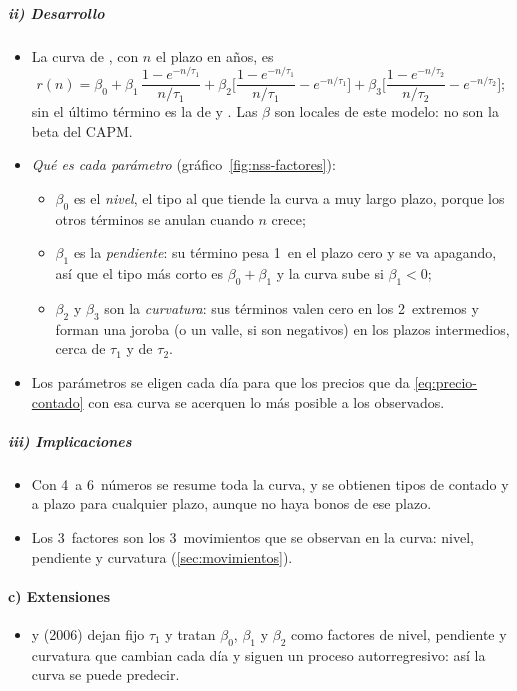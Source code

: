 \documentclass[11pt]{article}
\begin{document}
\subparagraph{ii) Desarrollo}
\begin{itemize}
\item La curva de , con $n$ el plazo en años, es
  \begin{equation}\label{eq:svensson}
  r(n)=\beta_0+\beta_1\,\frac{1-e^{-n/\tau_1}}{n/\tau_1}+\beta_2\Big[\frac{1-e^{-n/\tau_1}}{n/\tau_1}-e^{-n/\tau_1}\Big]+\beta_3\Big[\frac{1-e^{-n/\tau_2}}{n/\tau_2}-e^{-n/\tau_2}\Big];
  \end{equation}
  sin el último término es la de  y . Las $\beta$ son locales de este modelo: no son la beta del CAPM.
\item \emph{Qué es cada parámetro} (gráfico~\ref{fig:nss-factores}):
  \begin{itemize}
  \item $\beta_0$ es el \emph{nivel}, el tipo al que tiende la curva a muy largo plazo, porque los otros términos se anulan cuando $n$ crece;
  \item $\beta_1$ es la \emph{pendiente}: su término pesa 1~en el plazo cero y se va apagando, así que el tipo más corto es $\beta_0+\beta_1$ y la curva sube si $\beta_1<0$;
  \item $\beta_2$ y $\beta_3$ son la \emph{curvatura}: sus términos valen cero en los 2~extremos y forman una joroba (o un valle, si son negativos) en los plazos intermedios, cerca de $\tau_1$ y de $\tau_2$.
  \end{itemize}
\item Los parámetros se eligen cada día para que los precios que da \eqref{eq:precio-contado} con esa curva se acerquen lo más posible a los observados.
\end{itemize}

\subparagraph{iii) Implicaciones}
\begin{itemize}
\item Con 4~a 6~números se resume toda la curva, y se obtienen tipos de contado y a plazo para cualquier plazo, aunque no haya bonos de ese plazo.
\item Los 3~factores son los 3~movimientos que se observan en la curva: nivel, pendiente y curvatura (\ref{sec:movimientos}).
\end{itemize}

\paragraph{c) Extensiones}
\begin{itemize}
\item {} y  (2006)\nocite{DieboldLi2006Forecasting} dejan fijo $\tau_1$ y tratan $\beta_0$, $\beta_1$ y $\beta_2$ como factores de nivel, pendiente y curvatura que cambian cada día y siguen un proceso autorregresivo: así la curva se puede predecir.
\end{itemize}
\end{document}
